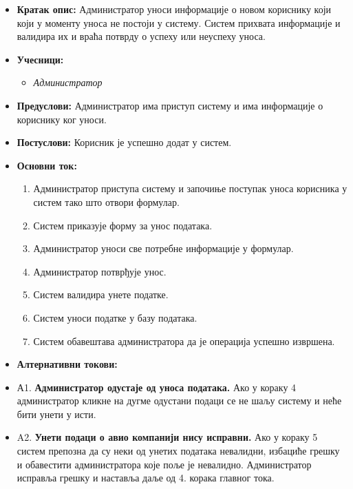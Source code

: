 \documentclass{article}
\begin{document}
\begin{itemize}
    \item \textbf{Кратак опис:} Администратор уноси информације о новом кориснику који који у моменту уноса не постоји у систему. Систем прихвата информације и валидира их и враћа потврду о успеху или неуспеху уноса.
    \item \textbf{Учесници:}
        \begin{itemize}
            \item \textit{Администратор}
        \end{itemize}
    \item \textbf{Предуслови:} Администратор има приступ систему и има информације о кориснику ког уноси.
    \item \textbf{Постуслови:} Корисник је успешно додат у систем.
    \item \textbf{Основни ток:}
        \begin{enumerate}
            \item Администратор приступа систему и започиње поступак уноса корисника у систем тако што отвори формулар.
            \item Систем приказује форму за унос података.
            \item Администратор уноси све потребне информације у формулар.
            \item Администратор потврђује унос.
            \item Систем валидира унете податке.
            \item Систем уноси податке у базу података.
            \item Систем обавештава администратора да је операција успешно извршена.
        \end{enumerate}
    
    \item \textbf{Алтернативни токови:}
    \item А1. \textbf{Администратор одустаје од уноса података.} Ако у кораку 4 администратор кликне на дугме одустани подаци се не шаљу систему и неће бити унети у исти.
    \item A2. \textbf{Унети подаци о авио компанији нису исправни.} Ако у кораку 5 систем препозна да су неки од унетих података невалидни, избациће грешку и обавестити администратора које поље је невалидно. Администратор исправља грешку и наставља даље од 4. корака главног тока. 
\end{itemize}
\end{document}
